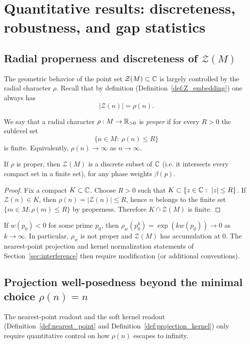 \section{Quantitative results: discreteness, robustness, and gap statistics}
\label{sec:quantitative}

\subsection{Radial properness and discreteness of \texorpdfstring{$\mathcal{Z}(M)$}{Z(M)}}
The geometric behavior of the point set $\mathcal{Z}(M)\subset\mathbb{C}$ is largely controlled by the radial character $\rho$.
Recall that by definition (Definition~\ref{def:Z_embedding}) one always has
$$
|\mathcal{Z}(n)|=\rho(n).
$$

\begin{definition}
\label{def:radial_properness}
We say that a radial character $\rho:M\to\mathbb{R}_{>0}$ is \emph{proper} if for every $R>0$ the sublevel set
$$
\{n\in M:\ \rho(n)\le R\}
$$
is finite. Equivalently, $\rho(n)\to\infty$ as $n\to\infty$.
\end{definition}

\begin{proposition}
\label{prop:Z_discrete}
If $\rho$ is proper, then $\mathcal{Z}(M)$ is a discrete subset of $\mathbb{C}$ (i.e. it intersects every compact set in a finite set), for any phase weights $\beta(p)$.
\end{proposition}

\begin{proof}
Fix a compact $K\subset\mathbb{C}$. Choose $R>0$ such that $K\subset\{z\in\mathbb{C}:\ |z|\le R\}$. If $\mathcal{Z}(n)\in K$, then $\rho(n)=|\mathcal{Z}(n)|\le R$, hence $n$ belongs to the finite set $\{m\in M:\rho(m)\le R\}$ by properness.
Therefore $K\cap\mathcal{Z}(M)$ is finite.
\end{proof}

\begin{remark}
If $w(p_0)<0$ for some prime $p_0$, then $\rho_w(p_0^k)=\exp(k w(p_0))\to 0$ as $k\to\infty$.
In particular, $\rho_w$ is not proper and $\mathcal{Z}(M)$ has accumulation at $0$.
The nearest-point projection and kernel normalization statements of Section~\ref{sec:interference} then require modification (or additional conventions).
\end{remark}

\subsection{Projection well-posedness beyond the minimal choice \texorpdfstring{$\rho(n)=n$}{rho(n)=n}}
The nearest-point readout and the soft kernel readout (Definition~\ref{def:nearest_point} and Definition~\ref{def:projection_kernel}) only require quantitative control on how $\rho(n)$ escapes to infinity.

